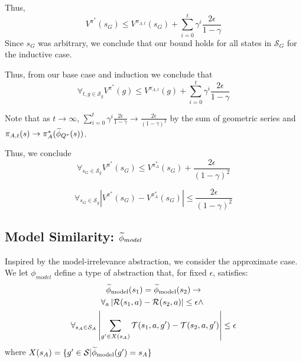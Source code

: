 Thus,
\begin{equation*}
V^{\pi^*}(s_G) \leq V^{\pi_{A,t}}(s_G)  + \sum_{i=0}^{t}\gamma^i \frac{2\epsilon}{1-\gamma}
\end{equation*}
Since $s_G$ was arbitrary, we conclude that our bound holds for all states in $\mathcal{S}_G$ for the inductive case.

Thus, from our base case and induction we conclude that
\begin{equation}
\forall_{t, g \in \mathcal{S}_g} V^{\pi^*}(g) \leq  V^{\pi_{A,t}}(g) + \sum_{i=0}^{t}\gamma^i \frac{2\epsilon}{1-\gamma}
\end{equation}

Note that as $t \rightarrow \infty$, $\sum_{i=0}^{t}\gamma^i \frac{2\epsilon}{1-\gamma} \rightarrow \frac{2\epsilon}{(1-\gamma)^2}$ by the sum of geometric series and $\pi_{A,t}(s) \rightarrow \pi_A^*(\widetilde \phi_{Q^*}(s))$.

Thus, we conclude
\begin{equation*}
\forall_{s_G \in \mathcal{S}_g} V^{\pi^*}(s_G) \leq  V^{\pi_{A}^*}(s_G) + \frac{2\epsilon}{(1-\gamma)^2}
\end{equation*}

\begin{equation*}
\forall_{s_G \in \mathcal{S}_g} \left | V^{\pi^*}(s_G) - V^{\pi_{A}^*}(s_G) \right | \leq  \frac{2\epsilon}{(1-\gamma)^2}
\end{equation*}



\subsection{Model Similarity: $\widetilde \phi_{model}$}

Inspired by the model-irrelevance abstraction, we consider the approximate case. We let $\phi_{model}$ define a type of abstraction that, for fixed $\epsilon$, satisfies:
\begin{multline}
\widetilde \phi_{\text{model}}(s_1) = \widetilde \phi_{\text{model}}(s_2) \rightarrow \\
\forall_a \left| \mathcal{R}(s_1, a) - \mathcal{R}(s_2, a)\right| \leq \epsilon \wedge\ \\
\forall_{s_A \in \mathcal{S}_A} \left|\sum_{g' \in X(s_A)}\mathcal{T}(s_1, a, g') - \mathcal{T}(s_2, a,g')\right| \leq \epsilon
\end{multline}
where $X(s_A) = \{ g' \in \mathcal{S} | \widetilde \phi_{\text{model}}(g') = s_A \}$


